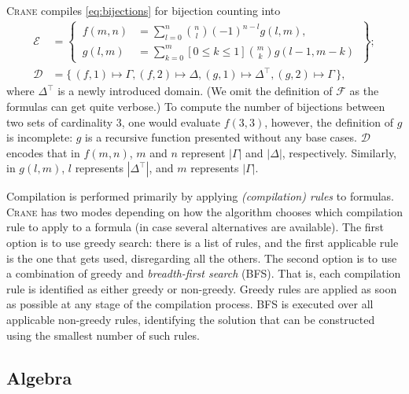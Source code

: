 \documentclass[a4paper,UKenglish,cleveref, autoref, thm-restate]{lipics-v2021}
\begin{document}
\begin{example}
  \textsc{Crane} compiles \cref{eq:bijections} for bijection counting into
  \begin{align*}
    \mathcal{E} &= \left\{\,\begin{aligned}f(m, n) &= \sum_{l=0}^{n} \binom{n}{l}{(-1)}^{n-l}g(l, m),\\ g(l, m) &= \sum_{k=0}^{m}[0 \le k \le 1]\binom{m}{k}g(l-1, m-k)\end{aligned}\,\right\};\\
    \mathcal{D} &= \{\, (f, 1) \mapsto \Gamma, (f, 2) \mapsto \Delta, (g, 1) \mapsto \Delta^{\top}, (g, 2) \mapsto \Gamma \,\},
  \end{align*}
  where $\Delta^{\top}$ is a newly introduced domain. (We omit the definition of
  $\mathcal{F}$ as the formulas can get quite verbose.) To compute the number of
  bijections between two sets of cardinality 3, one would evaluate $f(3, 3)$,
  however, the definition of $g$ is incomplete: $g$ is a recursive function
  presented without any base cases. $\mathcal{D}$ encodes that in $f(m, n)$, $m$
  and $n$ represent $|\Gamma|$ and $|\Delta|$, respectively. Similarly, in
  $g(l, m)$, $l$ represents $|\Delta^{\top}|$, and $m$ represents $|\Gamma|$.
\end{example}

Compilation is performed primarily by applying \emph{(compilation) rules} to
formulas. \textsc{Crane} has two modes depending on how the algorithm chooses
which compilation rule to apply to a formula (in case several alternatives are
available). The first option is to use greedy search: there is a list of rules,
and the first applicable rule is the one that gets used, disregarding all the
others. The second option is to use a combination of greedy and
\emph{breadth-first search} (BFS). That is, each compilation rule is identified
as either greedy or non-greedy. Greedy rules are applied as soon as possible at
any stage of the compilation process. BFS is executed over all applicable
non-greedy rules, identifying the solution that can be constructed using the
smallest number of such rules.

\subsection{Algebra}\label{sec:algebra}
\end{document}
